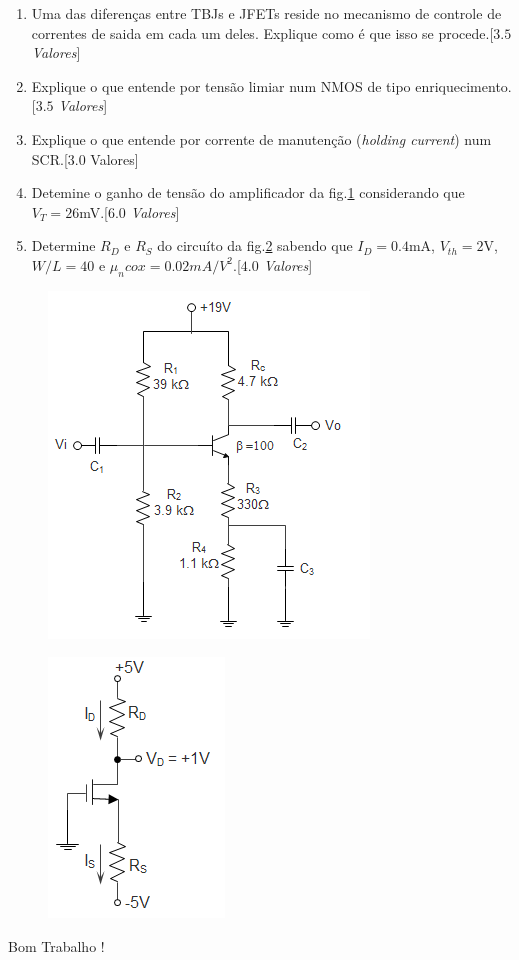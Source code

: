 \documentclass[11pt,a4paper,twoside]{report}
\begin{document}
\begin{enumerate}
\item Uma das diferen\c cas entre TBJs e JFETs reside no mecanismo de controle de correntes de saida em cada um deles. Explique como \'e que isso se procede.[\textit{$3.5$ Valores}]
\item Explique o que entende por tens\~ao limiar num NMOS de tipo enriquecimento.[\textit{$3.5$ Valores}]
\item Explique o que entende por corrente de manuten\c c\~ao (\textit{holding current}) num SCR.[$3.0$ Valores]
\item Detemine o ganho de tens\~ao do amplificador da fig.\ref{f2} considerando que $V_T=26$mV.[\textit{$6.0$ Valores}]
\item Determine $R_D$ e $R_S$ do circu\'ito da fig.\ref{a} sabendo que  $I_D=0.4$mA, $V_{th}=2$V, $W/L=40$ e $\mu_n cox =0.02mA/V^{2}$.[\textit{$4.0$ Valores}]
\end{enumerate}
  \noindent
\begin{minipage}[c]{5cm}
 \begin{figure}[H]
\centering
\includegraphics[scale=0.7]{test2tbj}
\caption{}
\label{f2}
\end{figure}
\end{minipage}\hfill
\begin{minipage}[c]{9cm}
\begin{figure}[H]
\centering
\includegraphics[scale=0.7]{MOSFET1}
\caption{}
\label{a}
\end{figure}
\end{minipage}



\vspace{1.5cm}

\huge{Bom Trabalho !}
\end{document}
